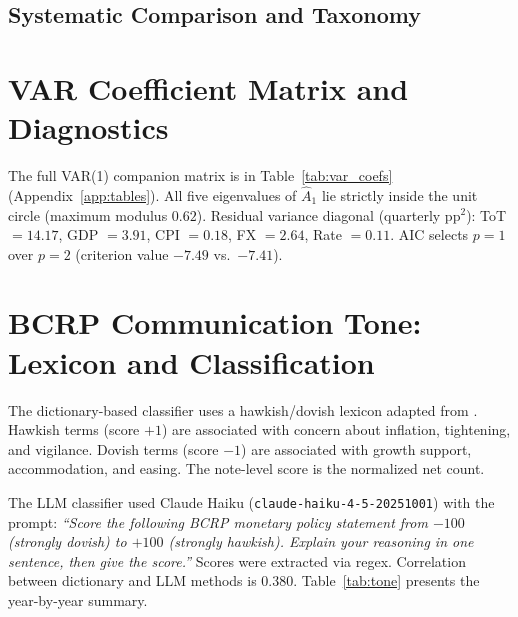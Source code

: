 \documentclass[12pt,letterpaper]{article}
\newenvironment{mytable}[2]{%
  \begin{table}[H]
  \centering
  \caption{#1}
  \label{#2}
  \begin{threeparttable}
}{%
  \end{threeparttable}
  \end{table}
}
\begin{document}
\subsection*{Systematic Comparison and Taxonomy}

\begin{mytable}{Systematic Comparison of Identification Strategies}{tab:master}
  
\end{mytable}

\begin{mytable}{Identification Feasibility Taxonomy for Selected EME Central Banks}{tab:eme_taxonomy}
  
\end{mytable}

\FloatBarrier
\section{VAR Coefficient Matrix and Diagnostics}
\label{app:var}

The full VAR(1) companion matrix is in Table~\ref{tab:var_coefs} (Appendix~\ref{app:tables}).
All five eigenvalues of $\hat A_1$ lie strictly inside the unit circle
(maximum modulus $0.62$). Residual variance diagonal (quarterly pp$^2$):
ToT $=14.17$, GDP $=3.91$, CPI $=0.18$, FX $=2.64$, Rate $=0.11$.
AIC selects $p=1$ over $p=2$ (criterion value $-7.49$ vs.\ $-7.41$).

\FloatBarrier
\section{BCRP Communication Tone: Lexicon and Classification}
\label{app:tone}

The dictionary-based classifier uses a hawkish/dovish lexicon adapted from
\citet{lahura2020}. Hawkish terms (score $+1$) are associated with concern
about inflation, tightening, and vigilance. Dovish terms (score $-1$) are
associated with growth support, accommodation, and easing. The note-level
score is the normalized net count.

The LLM classifier used Claude Haiku (\texttt{claude-haiku-4-5-20251001}) with
the prompt: \textit{``Score the following BCRP monetary policy statement
from $-100$ (strongly dovish) to $+100$ (strongly hawkish). Explain your
reasoning in one sentence, then give the score.''} Scores were extracted
via regex. Correlation between dictionary and LLM methods is $0.380$.
Table~\ref{tab:tone} presents the year-by-year summary.
\end{document}
